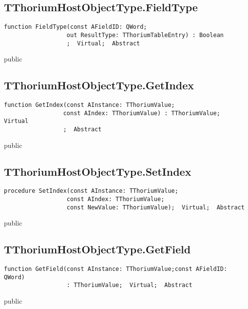 \subsection{TThoriumHostObjectType.FieldType}
\label{thoriumcore:thorium:tthoriumhostobjecttype:fieldtype}
\begin{FPCList}
\Synopsis
\Declaration 

\begin{verbatim}
function FieldType(const AFieldID: QWord;
                  out ResultType: TThoriumTableEntry) : Boolean
                  ;  Virtual;  Abstract
\end{verbatim}
\Visibility
public
\Description
\Errors
\end{FPCList}
\subsection{TThoriumHostObjectType.GetIndex}
\label{thoriumcore:thorium:tthoriumhostobjecttype:getindex}
\begin{FPCList}
\Synopsis
\Declaration 

\begin{verbatim}
function GetIndex(const AInstance: TThoriumValue;
                 const AIndex: TThoriumValue) : TThoriumValue;  Virtual
                 ;  Abstract
\end{verbatim}
\Visibility
public
\Description
\Errors
\end{FPCList}
\subsection{TThoriumHostObjectType.SetIndex}
\label{thoriumcore:thorium:tthoriumhostobjecttype:setindex}
\begin{FPCList}
\Synopsis
\Declaration 

\begin{verbatim}
procedure SetIndex(const AInstance: TThoriumValue;
                  const AIndex: TThoriumValue;
                  const NewValue: TThoriumValue);  Virtual;  Abstract
\end{verbatim}
\Visibility
public
\Description
\Errors
\end{FPCList}
\subsection{TThoriumHostObjectType.GetField}
\label{thoriumcore:thorium:tthoriumhostobjecttype:getfield}
\begin{FPCList}
\Synopsis
\Declaration 

\begin{verbatim}
function GetField(const AInstance: TThoriumValue;const AFieldID: QWord)
                  : TThoriumValue;  Virtual;  Abstract
\end{verbatim}
\Visibility
public
\Description
\Errors
\end{FPCList}
